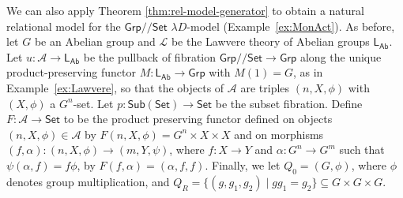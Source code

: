 \documentclass[a4paper,UKenglish]{lipics}
\newcommand{\msf}[1]{\mathsf{#1}} %
\newcommand{\Grp}{\msf{Grp}}
\newcommand{\Set}{\msf{Set}}
\newcommand{\Sub}[1]{\msf{Sub}(#1)}
\newcommand{\LAb}{\msf{L}_{\msf{Ab}}}
\newcommand{\A}{\mathcal{A}}
\newcommand{\Lslice}[1]{#1/\!/\Set}
\newcommand{\GrpSet}{\Lslice{\Grp}}
\begin{document}
\begin{example}\label{ex:relMon}
  We can also apply Theorem \ref{thm:rel-model-generator} to obtain a
  natural relational model for the $\GrpSet$ $\lambda D$-model 
  (Example~\ref{ex:MonAct}). As
  before, let $G$ be an Abelian group and $\mathcal{L}$ be the Lawvere
  theory of Abelian groups $\LAb$. Let $u:\A\to\LAb$ 
  be the pullback of fibration $\GrpSet\to\Grp$ along the 
  unique product-preserving 
  functor 
  $M:\LAb\to\Grp$ with $M(1)=G$, as in Example~\ref{ex:Lawvere},
  so that the objects of $\A$ are triples 
  $(n,X,\phi)$ with $(X,\phi)$ a $G^n$-set.
  Let 
  $p:\Sub{\Set} \rightarrow \Set$ be the subset
  fibration. Define $F:\A\rightarrow \Set$ 
  to be the product preserving functor defined on
  objects $(n,X,\phi) \in \A$ by $F(n,X, \phi) = G^{n}
  \times X \times X$ and on morphisms $(f, \alpha) : (n,X,\phi)
  \rightarrow (m, Y,\psi)$, where $f: X \rightarrow Y$ and $\alpha :
  G^n \rightarrow G^m$ such that $\psi (\alpha, f) = f \phi$, by
  $F(f,\alpha) = (\alpha, f, f)$. Finally, we let $Q_0 = (G,\phi)$,
  where $\phi$ denotes group multiplication, and $Q_R = \{(g,g_1,g_2)
  \mathrel| gg_1 = g_2 \} \subseteq G \times G \times G$.


\end{example}
\end{document}
